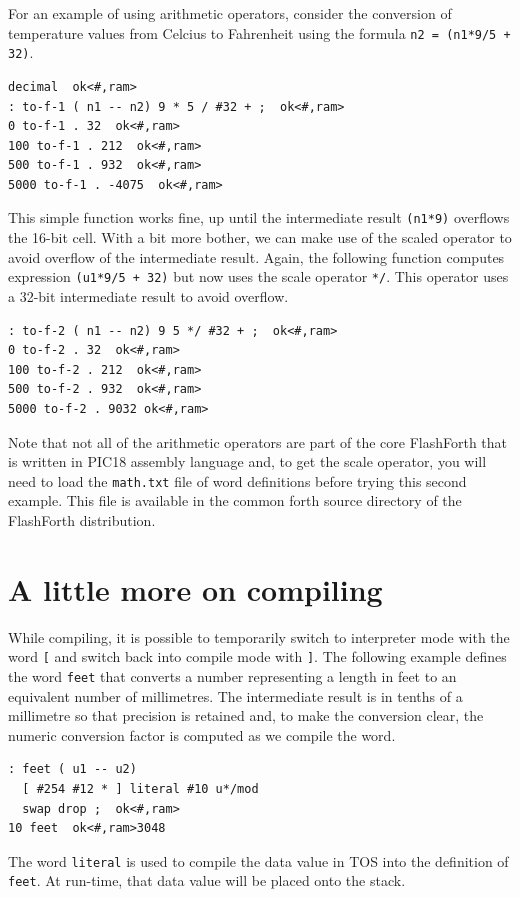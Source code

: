 \documentclass[12pt,a4paper]{article}
\begin{document}
\medskip
For an example of using arithmetic operators, consider the 
conversion of temperature values from Celcius to Fahrenheit 
using the formula \verb!n2 = (n1*9/5 + 32)!.
\begin{verbatim}
decimal  ok<#,ram>
: to-f-1 ( n1 -- n2) 9 * 5 / #32 + ;  ok<#,ram>
0 to-f-1 . 32  ok<#,ram>
100 to-f-1 . 212  ok<#,ram>
500 to-f-1 . 932  ok<#,ram>
5000 to-f-1 . -4075  ok<#,ram>
\end{verbatim}
This simple function works fine, up until the intermediate result
\verb!(n1*9)! overflows the 16-bit cell.
With a bit more bother, we can make use of the scaled operator 
to avoid overflow of the intermediate result.
Again, the following function computes expression \verb!(u1*9/5 + 32)!
but now uses the scale operator \verb!*/!. 
This operator uses a 32-bit intermediate result to avoid overflow.
\begin{verbatim}
: to-f-2 ( n1 -- n2) 9 5 */ #32 + ;  ok<#,ram>
0 to-f-2 . 32  ok<#,ram>
100 to-f-2 . 212  ok<#,ram>
500 to-f-2 . 932  ok<#,ram>
5000 to-f-2 . 9032 ok<#,ram>  
\end{verbatim}
Note that not all of the arithmetic operators are part of the core FlashForth
that is written in PIC18 assembly language and, to get the scale operator,
you will need to load the \verb!math.txt! file of word definitions before
trying this second example.
This file is available in the common forth source directory of the FlashForth distribution.

\newpage
\section{A little more on compiling}
\label{sec:compile-mode}
%
While compiling, it is possible to temporarily switch to interpreter mode
with the word \verb![! and switch back into compile mode with \verb!]!.
The following example defines the word \verb!feet! that converts a number
representing a length in feet to an equivalent number of millimetres.
The intermediate result is in tenths of a millimetre so that precision is retained and,
to make the conversion clear, the numeric conversion factor is computed
as we compile the word.
\begin{verbatim}
: feet ( u1 -- u2) 
  [ #254 #12 * ] literal #10 u*/mod 
  swap drop ;  ok<#,ram>
10 feet  ok<#,ram>3048 
\end{verbatim}
The word \verb!literal! is used to compile the data value in TOS 
into the definition of \verb!feet!.
At run-time, that data value will be placed onto the stack.
\end{document}
